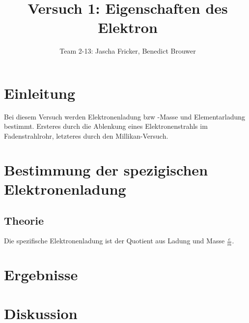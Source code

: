 \documentclass[11pt, a4paper]{article}
\title{Versuch 1: Eigenschaften des Elektron}
\author{Team 2-13: Jascha Fricker, Benedict Brouwer}
\begin{document}
    \maketitle


    \tableofcontents

    \newpage

    \section{Einleitung}

    Bei diesem Versuch werden Elektronenladung bzw -Masse und Elementarladung bestimmt. Ersteres durch die Ablenkung eines Elektronenstrahls im
    Fadenstrahlrohr, letzteres durch den Millikan-Versuch.

    \section{Bestimmung der spezigischen Elektronenladung}

    \subsection{Theorie}

    Die spezifische Elektronenladung ist der Quotient aus Ladung und Masse $\frac{e}{m}$.


    \section{Ergebnisse}

    \section{Diskussion}

    
    
\end{document}
